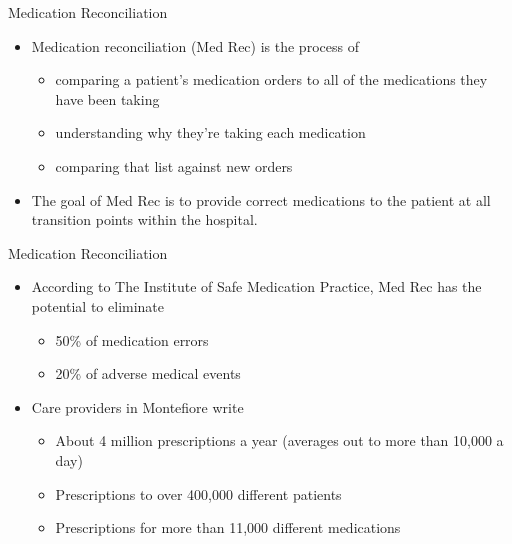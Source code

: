 \documentclass[10pt]{beamer}
\begin{document}
\begin{frame}{Medication Reconciliation}
	\begin{itemize}
		\item Medication reconciliation (Med Rec) is the process of
		\begin{itemize}
			\item comparing a patient's medication orders to all of the medications they have been taking
			\item understanding why they're taking each medication
			\item comparing that list against new orders
		\end{itemize} 
		\item The goal of Med Rec is to provide correct medications to the patient at all transition points within the hospital.		   
	\end{itemize}
\end{frame}

\begin{frame}{Medication Reconciliation}
	\begin{itemize}
		\item According to The Institute of Safe Medication Practice, Med Rec has the potential to eliminate
		\begin{itemize}
			\item 50\% of medication errors
			\item 20\% of adverse medical events
		\end{itemize}
		\item Care providers in Montefiore write 
		\begin{itemize}
			\item About 4 million prescriptions a year (averages out to more than 10,000 a day)
			\item Prescriptions to over 400,000 different patients
			\item Prescriptions for more than 11,000 different medications
		\end{itemize}		   
	\end{itemize}
\end{frame}
\end{document}
